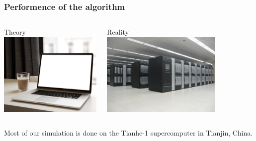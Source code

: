 \documentclass[xcolor=table, 10pt, aspectratio=169]{beamer}
\begin{document}
\begin{frame}
  \frametitle{Performence of the algorithm}
    \begin{columns}
      \begin{center}
				Theory\\
				\vspace{.5cm}
        \includegraphics[height=4cm]{laptop_coffee}
      \end{center}
      \begin{center}
				Reality\\
				\vspace{.5cm}
        \includegraphics[height=4cm]{tianhe}
      \end{center}
    \end{columns}
\vspace{.5cm}
Most of our simulation is done on the Tianhe-1 supercomputer in Tianjin, China.
\end{frame}
\end{document}
